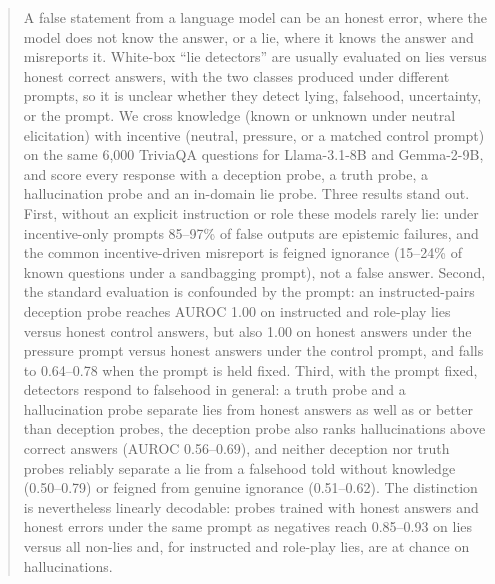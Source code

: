 \begin{abstract}
A false statement from a language model can be an honest error, where the model does not know the answer, or a lie, where it knows the answer and misreports it. White-box ``lie detectors'' are usually evaluated on lies versus honest correct answers, with the two classes produced under different prompts, so it is unclear whether they detect lying, falsehood, uncertainty, or the prompt. We cross knowledge (known or unknown under neutral elicitation) with incentive (neutral, pressure, or a matched control prompt) on the same 6{,}000 TriviaQA questions for Llama-3.1-8B and Gemma-2-9B, and score every response with a deception probe, a truth probe, a hallucination probe and an in-domain lie probe. Three results stand out. First, without an explicit instruction or role these models rarely lie: under incentive-only prompts 85--97\% of false outputs are epistemic failures, and the common incentive-driven misreport is feigned ignorance (15--24\% of known questions under a sandbagging prompt), not a false answer. Second, the standard evaluation is confounded by the prompt: an instructed-pairs deception probe reaches AUROC 1.00 on instructed and role-play lies versus honest control answers, but also 1.00 on honest answers under the pressure prompt versus honest answers under the control prompt, and falls to 0.64--0.78 when the prompt is held fixed. Third, with the prompt fixed, detectors respond to falsehood in general: a truth probe and a hallucination probe separate lies from honest answers as well as or better than deception probes, the deception probe also ranks hallucinations above correct answers (AUROC 0.56--0.69), and neither deception nor truth probes reliably separate a lie from a falsehood told without knowledge (0.50--0.79) or feigned from genuine ignorance (0.51--0.62). The distinction is nevertheless linearly decodable: probes trained with honest answers and honest errors under the same prompt as negatives reach 0.85--0.93 on lies versus all non-lies and, for instructed and role-play lies, are at chance on hallucinations.
\end{abstract}
